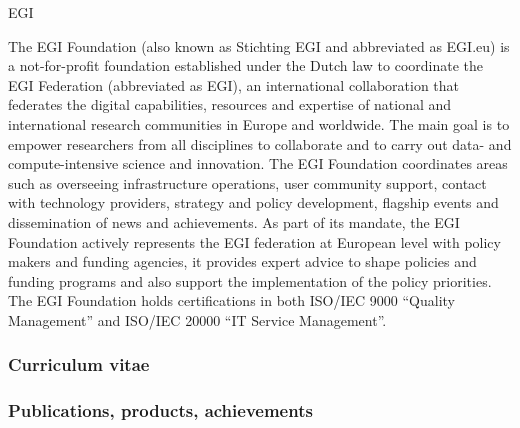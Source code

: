 \begin{sitedescription}{EGI}


The EGI Foundation (also known as Stichting EGI and abbreviated as EGI.eu) 
is a not-for-profit foundation established under the Dutch law to coordinate 
the EGI Federation (abbreviated as EGI), an international collaboration that 
federates the digital capabilities, resources and expertise of national and 
international research communities in Europe and worldwide. 
The main goal is to empower researchers from all disciplines to collaborate 
and to carry out data- and compute-intensive science and innovation. 
The EGI Foundation coordinates areas such as overseeing infrastructure operations, 
user community support, contact with technology providers, strategy and policy 
development, flagship events and dissemination of news and achievements. 
As part of its mandate, the EGI Foundation actively represents the EGI federation 
at European level with policy makers and funding agencies, it provides expert 
advice to shape policies and funding programs and also support the implementation 
of the policy priorities. 
The EGI Foundation holds certifications in both ISO/IEC 9000 “Quality Management” 
and ISO/IEC 20000 “IT Service Management”. 

%

\subsubsection*{Curriculum vitae}


%



\subsubsection*{Publications, products, achievements}


\end{sitedescription}
